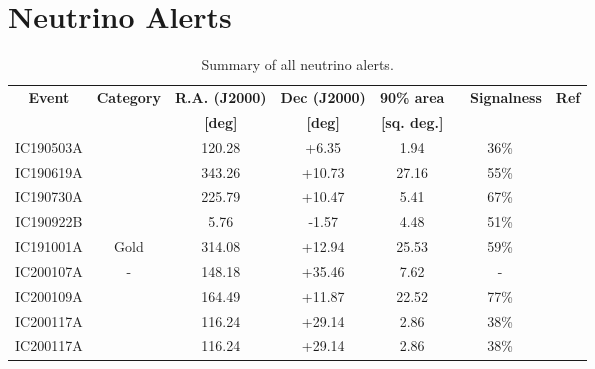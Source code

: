 \chapter{Neutrino Alerts}
\label{ch:alerts}

 \begin{table*}
	\centering
	\begin{tabular}{||c c c c c c c ||} 
		\hline
		\textbf{Event} & \textbf{Category} & \textbf{R.A. (J2000)} & \textbf{Dec (J2000)} & \textbf{90\% area} &~ \textbf{Signalness}& \textbf{Ref}\\
		& & \textbf{[deg]}&\textbf{[deg]}& \textbf{[sq. deg.]} &&\\
		\hline
		IC190503A & &120.28 & +6.35 & 1.94& 36\%&\cite{ic190503a}\\
		IC190619A & &343.26 & +10.73 & 27.16 & 55\%&\cite{ic190619a}\\
		IC190730A & &225.79 & +10.47 & 5.41 & 67\%&\cite{ic190730a}\\
		IC190922B & &5.76 & -1.57 & 4.48& 51\%&\cite{ic190922b}\\
		IC191001A & Gold&314.08 & +12.94 & 25.53  & 59\%& \cite{ic191001a}\\
		IC200107A & - & 148.18 & +35.46 & 7.62  & - &\cite{ic200107a}\\
		IC200109A & &164.49 & +11.87 & 22.52  & 77\%&\cite{ic200109a}\\
		IC200117A & &116.24 & +29.14 & 2.86  & 38\%&\cite{ic200117a}\\
		IC200117A & &116.24 & +29.14 & 2.86  & 38\%&\cite{ic200117a}\\
		\hline
	\end{tabular}
	\caption{Summary of all neutrino alerts.}
	\label{tab:all_nu_alerts}
\end{table*}
